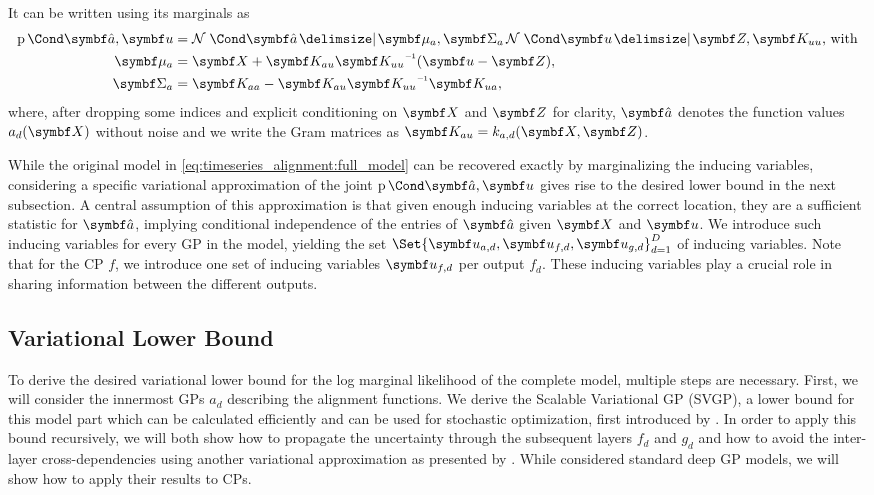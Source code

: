 It can be written using its marginals \parencite{titsias_variational_2009} as
\begin{align}
\label{eq:timeseries_alignment:augmented_joint}
\begin{split}
    \Prob{\rv{\hat{a}}, \rv{u}} &= \Gaussian{\rv{\hat{a}} \given \mat{\mu_a}, \mat{\Sigma_a}}\Gaussian{\rv{u} \given \rv{Z}, \mat{K_{uu}}}\text{, with} \\
    \mat{\mu_a} &= \mat{X} + \mat{K_{au}}\mat{K_{uu}}\inv(\rv{u} - \mat{Z}), \\
    \mat{\Sigma_a} &= \mat{K_{aa}} - \mat{K_{au}}\mat{K_{uu}}\inv\mat{K_{ua}},
\end{split}
\end{align}
where, after dropping some indices and explicit conditioning on $\mat{X}$ and $\mat{Z}$ for clarity, $\rv{\hat{a}}$ denotes the function values $a_d(\mat{X})$ without noise and we write the Gram matrices as $\mat{K_{au}} = k_{a, d}(\mat{X}, \mat{Z})$.

While the original model in \cref{eq:timeseries_alignment:full_model} can be recovered exactly by marginalizing the inducing variables, considering a specific variational approximation of the joint $\Prob{\rv{\hat{a}}, \rv{u}}$ gives rise to the desired lower bound in the next subsection.
A central assumption of this approximation \parencite{titsias_variational_2009} is that given enough inducing variables at the correct location, they are a sufficient statistic for $\rv{\hat{a}}$, implying conditional independence of the entries of $\rv{\hat{a}}$ given $\mat{X}$ and $\rv{u}$.
We introduce such inducing variables for every GP in the model, yielding the set $\Set{\rv{u_{a, d}}, \rv{u_{f, d}}, \rv{u_{g, d}}}_{d=1}^D$ of inducing variables.
Note that for the CP $f$, we introduce one set of inducing variables $\rv{u_{f, d}}$ per output $f_d$.
These inducing variables play a crucial role in sharing information between the different outputs.


\subsection{Variational Lower Bound}
\label{sub:timeseries_alignment:lower_bound}
To derive the desired variational lower bound for the log marginal likelihood of the complete model, multiple steps are necessary.
First, we will consider the innermost GPs $a_d$ describing the alignment functions.
We derive the Scalable Variational GP (SVGP), a lower bound for this model part which can be calculated efficiently and can be used for stochastic optimization, first introduced by \textcite{hensman_gaussian_2013}.
In order to apply this bound recursively, we will both show how to propagate the uncertainty through the subsequent layers $f_d$ and $g_d$ and how to avoid the inter-layer cross-dependencies using another variational approximation as presented by \textcite{hensman_nested_2014}.
While \citeauthor{hensman_nested_2014} considered standard deep GP models, we will show how to apply their results to CPs.

